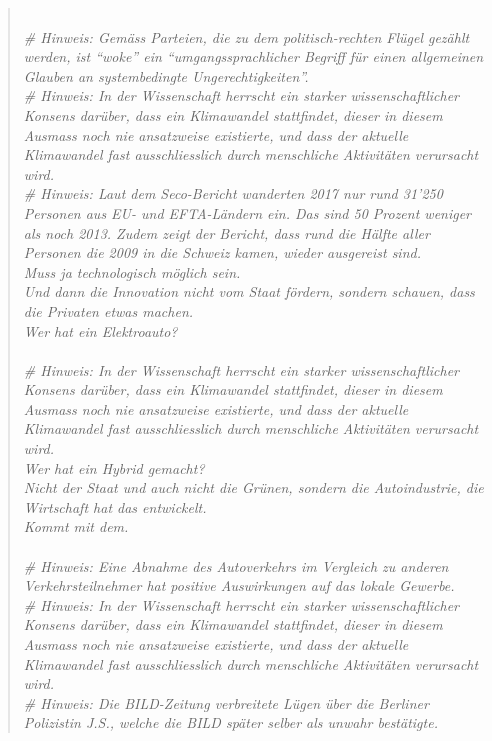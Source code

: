 \documentclass[a4paper,11pt]{report}
\newenvironment{itquote}
	{\begin{quote}\itshape}
	{\end{quote}\ignorespacesafterend}
\begin{document}
\begin{itquote}
				\\
				  \# Hinweis: Gemäss Parteien, die zu dem politisch-rechten Flügel gezählt werden, ist ``woke'' ein ``umgangssprachlicher Begriff für einen allgemeinen Glauben an systembedingte Ungerechtigkeiten''.\\
				  \# Hinweis: In der Wissenschaft herrscht ein starker wissenschaftlicher Konsens darüber, dass ein Klimawandel stattfindet, dieser in diesem Ausmass noch nie ansatzweise existierte, und dass der aktuelle Klimawandel fast ausschliesslich durch menschliche Aktivitäten verursacht wird.\\
				  \# Hinweis: Laut dem Seco-Bericht wanderten 2017 nur rund 31'250 Personen aus EU- und EFTA-Ländern ein. Das sind 50 Prozent weniger als noch 2013. Zudem zeigt der Bericht, dass rund die Hälfte aller Personen die 2009 in die Schweiz kamen, wieder ausgereist sind.\\
				Muss ja technologisch möglich sein.\\
				Und dann die Innovation nicht vom Staat fördern, sondern schauen, dass die Privaten etwas machen.\\
				Wer hat ein Elektroauto?\\
				\\
				  \# Hinweis: In der Wissenschaft herrscht ein starker wissenschaftlicher Konsens darüber, dass ein Klimawandel stattfindet, dieser in diesem Ausmass noch nie ansatzweise existierte, und dass der aktuelle Klimawandel fast ausschliesslich durch menschliche Aktivitäten verursacht wird.\\
				Wer hat ein Hybrid gemacht?\\
				Nicht der Staat und auch nicht die Grünen, sondern die Autoindustrie, die Wirtschaft hat das entwickelt.\\
				Kommt mit dem.\\
				\\
				  \# Hinweis: Eine Abnahme des Autoverkehrs im Vergleich zu anderen Verkehrsteilnehmer hat positive Auswirkungen auf das lokale Gewerbe.\\
				  \# Hinweis: In der Wissenschaft herrscht ein starker wissenschaftlicher Konsens darüber, dass ein Klimawandel stattfindet, dieser in diesem Ausmass noch nie ansatzweise existierte, und dass der aktuelle Klimawandel fast ausschliesslich durch menschliche Aktivitäten verursacht wird.\\
				  \# Hinweis: Die BILD-Zeitung verbreitete Lügen über die Berliner Polizistin J.S., welche die BILD später selber als unwahr bestätigte.\\

\end{itquote}
\end{document}

